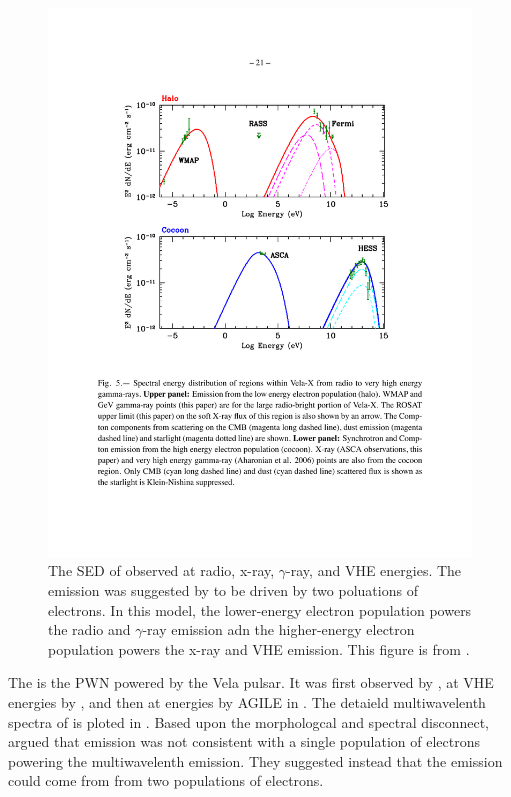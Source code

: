 \begin{figure}[htbp]
  \centering
    \includegraphics{chapters/introduction/figures/vela_x_sed_two_populations.pdf}
    \caption{The \ac{SED} of \velax observed at radio, x-ray,
      $\gamma$-ray, and \ac{VHE} energies. The emission was suggested
      by \citep{abdo_2010c_fermi-large} to be driven by two poluations
      of electrons.  In this model, the lower-energy electron population
      powers the radio and $\gamma$-ray emission adn the higher-energy
      electron population powers the x-ray and \ac{VHE} emission.
      This figure is from \cite{abdo_2010c_fermi-large}.}
\end{figure}


The \velax is the \ac{PWN} powered by the Vela pulsar.  It was first
observed by \cite{rishbeth_1958a_radio-emission}, at \ac{VHE} energies
by \cite{aharonian_2006a_first-detection}, and then at \gev energies
by \ac{AGILE} in \cite{pellizzoni_2010a_detection-gamma-ray}.
The detaield multiwavelenth spectra of \velax is ploted in
.  Based upon the morphologcal and
spectral disconnect, \citep{abdo_2010c_fermi-large} argued that emission
was not consistent with a single population of electrons powering the
multiwavelenth emission. They suggested instead that the emission could
come from from two populations of electrons.


